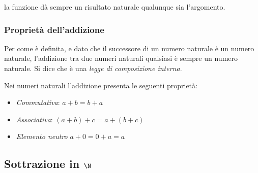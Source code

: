 \vspace{.5em}
\begin{minipage}[t]{.48\textwidth}
\begin{center}
\begin{inaccessibleblock}
\end{inaccessibleblock}
\end{center}
\end{minipage}
\hfill
\begin{minipage}[t]{.48\textwidth}
\begin{center}
\begin{inaccessibleblock}
\end{inaccessibleblock}
\end{center}
\end{minipage}

\begin{osservazione}{}{}
la funzione dà sempre un risultato naturale qualunque sia l'argomento.

\end{osservazione}

\subsubsection{Proprietà dell'addizione}

Per come è definita, e dato che il successore di un numero naturale è un 
numero naturale, l'addizione tra due numeri naturali qualsiasi è sempre un
numero naturale. 
Si dice che è una \emph{legge di composizione interna}. 

Nei numeri naturali l'addizione presenta le seguenti proprietà:

\begin{itemize} [noitemsep]
 \item \emph{Commutativa}: \(a + b = b + a\)
 \item \emph{Associativa}: \((a + b) + c = a + (b + c)\)
 \item \emph{Elemento neutro} \(a + 0 = 0 + a = a\)
\end{itemize}

\subsection{Sottrazione in $\N$}

